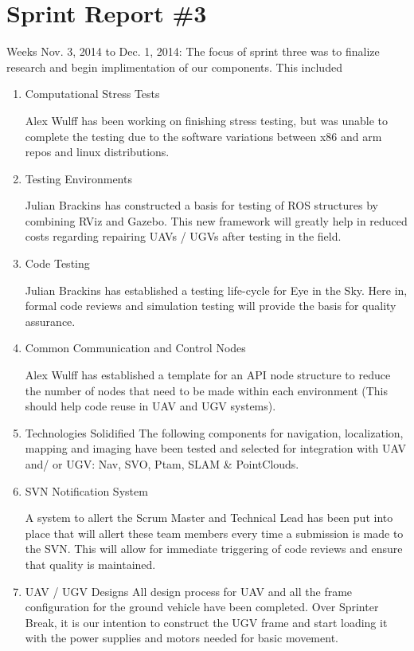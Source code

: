 \section{Sprint Report \#3}

Weeks Nov. 3, 2014 to Dec. 1, 2014:
The focus of sprint three was to finalize research and begin implimentation of our components.  This included

\begin{enumerate}

\item Computational Stress Tests

Alex Wulff has been working on finishing stress testing, but was unable to complete the testing due to the software variations between x86 and arm repos and linux distributions.

\item Testing Environments

Julian Brackins has constructed a basis for testing of ROS structures by combining RViz and Gazebo.  This new framework will greatly help in reduced costs regarding repairing UAVs / UGVs after testing in the field.

\item Code Testing

Julian Brackins has established a testing life-cycle for Eye in the Sky. Here in, formal code reviews and simulation testing will provide the basis for quality assurance.


\item Common Communication and Control Nodes

Alex Wulff has established a template for an API node structure to reduce the number of nodes that need to be made within each environment (This should help code reuse in UAV and UGV systems).


\item Technologies Solidified
The following components for navigation, localization, mapping and imaging have been tested and selected for integration with UAV and/ or UGV: Nav, SVO, Ptam, SLAM \& PointClouds.

\item SVN Notification System

A system to allert the Scrum Master and Technical Lead has been put into place that will allert these team members every time a submission is made to the SVN.  This will allow for immediate triggering of code reviews and ensure that quality is maintained.

\item UAV / UGV Designs
All design process for UAV and all the frame configuration for the ground vehicle have been completed.  Over Sprinter Break, it is our intention to construct the UGV frame and start loading it with the power supplies and motors needed for basic movement.
\end{enumerate}

